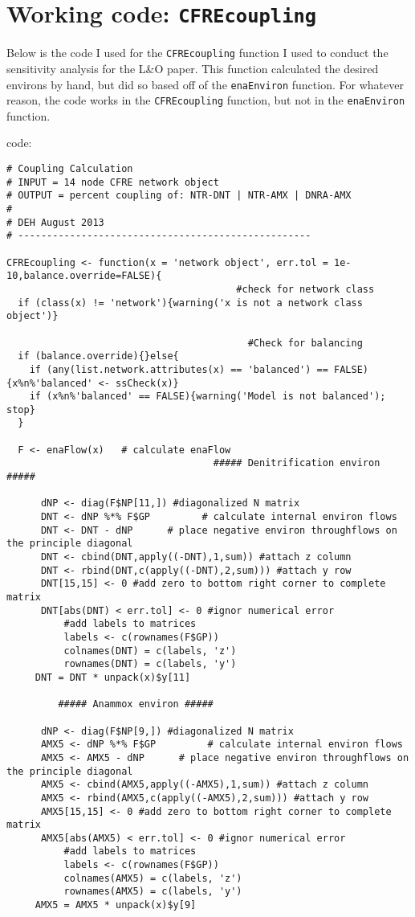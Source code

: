 \documentclass[]{article}
\begin{document}
\section{Working code: \texttt{CFREcoupling}}

Below is the code I used for the \texttt{CFREcoupling} function I used
to conduct the sensitivity analysis for the L\&O paper.  This function
calculated the desired environs by hand, but did so based off of the
\texttt{enaEnviron} function.  For whatever reason, the code works in
the \texttt{CFREcoupling} function, but not in the \texttt{enaEnviron}
function.

code:

\begin{verbatim}
# Coupling Calculation
# INPUT = 14 node CFRE network object
# OUTPUT = percent coupling of: NTR-DNT | NTR-AMX | DNRA-AMX
# 
# DEH August 2013
# ---------------------------------------------------

CFREcoupling <- function(x = 'network object', err.tol = 1e-10,balance.override=FALSE){
                                        #check for network class
  if (class(x) != 'network'){warning('x is not a network class object')}

                                          #Check for balancing
  if (balance.override){}else{
    if (any(list.network.attributes(x) == 'balanced') == FALSE){x%n%'balanced' <- ssCheck(x)}
    if (x%n%'balanced' == FALSE){warning('Model is not balanced'); stop}
  }

  F <- enaFlow(x)   # calculate enaFlow
                                    ##### Denitrification environ #####
    
      dNP <- diag(F$NP[11,]) #diagonalized N matrix
      DNT <- dNP %*% F$GP         # calculate internal environ flows
      DNT <- DNT - dNP      # place negative environ throughflows on the principle diagonal
      DNT <- cbind(DNT,apply((-DNT),1,sum)) #attach z column
      DNT <- rbind(DNT,c(apply((-DNT),2,sum))) #attach y row
      DNT[15,15] <- 0 #add zero to bottom right corner to complete matrix
      DNT[abs(DNT) < err.tol] <- 0 #ignor numerical error
          #add labels to matrices
          labels <- c(rownames(F$GP))
          colnames(DNT) = c(labels, 'z')
          rownames(DNT) = c(labels, 'y')
	 DNT = DNT * unpack(x)$y[11]
    
         ##### Anammox environ #####
    
      dNP <- diag(F$NP[9,]) #diagonalized N matrix
      AMX5 <- dNP %*% F$GP         # calculate internal environ flows
      AMX5 <- AMX5 - dNP      # place negative environ throughflows on the principle diagonal
      AMX5 <- cbind(AMX5,apply((-AMX5),1,sum)) #attach z column
      AMX5 <- rbind(AMX5,c(apply((-AMX5),2,sum))) #attach y row
      AMX5[15,15] <- 0 #add zero to bottom right corner to complete matrix
      AMX5[abs(AMX5) < err.tol] <- 0 #ignor numerical error
          #add labels to matrices
          labels <- c(rownames(F$GP))
          colnames(AMX5) = c(labels, 'z')
          rownames(AMX5) = c(labels, 'y')
	 AMX5 = AMX5 * unpack(x)$y[9]
    

\end{verbatim}
\end{document}
